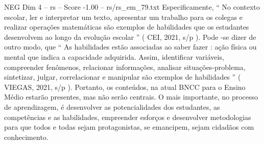 \begin{textsample}{NEG Dim 4 – rs – Score -1.00 – rs/rs\_em\_79.txt}
Especificamente, “ No contexto escolar, ler e interpretar um texto, apresentar um trabalho para os colegas e realizar operações matemáticas são exemplos de habilidades que os estudantes desenvolvem ao longo da evolução escolar ” ( CEI, 2021, s/p ).
Pode -se dizer de outro modo, que “ As habilidades estão associadas ao saber fazer : ação física ou mental que indica a capacidade adquirida.
Assim, identificar variáveis, compreender fenômenos, relacionar informações, analisar situações-problema, sintetizar, julgar, correlacionar e manipular são exemplos de habilidades ” ( VIEGAS, 2021, s/p ).
Portanto, os conteúdos, na atual BNCC para o Ensino Médio estarão presentes, mas não serão centrais.
O mais importante, no processo de aprendizagem, é desenvolver as potencialidades dos estudantes, as competências e as habilidades, empreender esforços e desenvolver metodologias para que todos e todas sejam protagonistas, se emancipem, sejam cidadãos com conhecimento.

\end{textsample}
